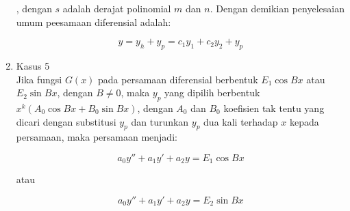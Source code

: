 \begin{enumerate}[1.]
	, dengan \begin{math} s \end{math} adalah derajat polinomial \begin{math} m \end{math} dan \begin{math} n \end{math}. Dengan demikian penyelesaian umum peesamaan diferensial adalah:

	\begin{equation} y = y_h + y_p = c_1 y_1 + c_2 y_2 + y_p \end{equation}

	\item Kasus 5 \\

	Jika fungsi \begin{math} G(x) \end{math} pada persamaan diferensial berbentuk \begin{math} E_1 \cos Bx \end{math} atau \begin{math} E_2 \sin Bx \end{math}, dengan \begin{math} B \neq 0 \end{math}, maka \begin{math} y_p \end{math} yang dipilih berbentuk \begin{math} x^{k} (A_0 \cos Bx + B_0 \sin Bx) \end{math}, dengan \begin{math} A_0 \end{math} dan \begin{math} B_0 \end{math} koefisien tak tentu yang dicari dengan substitusi \begin{math} y_p \end{math} dan turunkan \begin{math} y_p \end{math} dua kali terhadap \begin{math} x \end{math} kepada persamaan, maka persamaan menjadi:

	\begin{equation} a_0 y'' + a_1 y' + a_2 y = E_1 \cos Bx \end{equation}
		
	atau
		
	\begin{equation} a_0 y'' + a_1 y' + a_2 y = E_2 \sin Bx \end{equation}


\end{enumerate}

